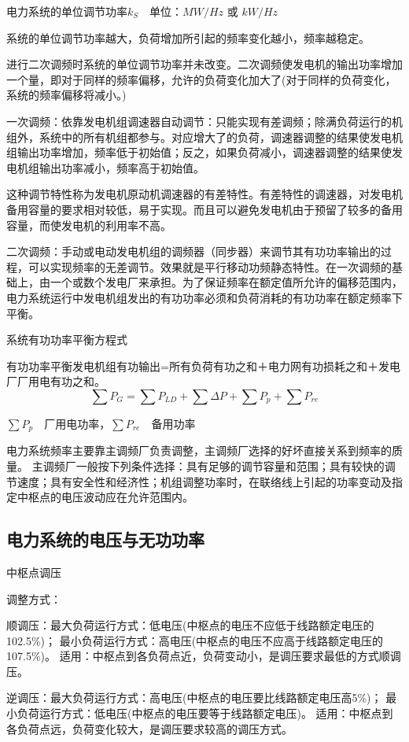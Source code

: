 \documentclass[UTF8, 12pt, a4paper]{ctexart}
\begin{document}
电力系统的单位调节功率$k_S \quad$单位：$MW/Hz$ 或 $kW/Hz$

系统的单位调节功率越大，负荷增加所引起的频率变化越小，频率越稳定。

进行二次调频时系统的单位调节功率并未改变。二次调频使发电机的输出功率增加一个量，即对于同样的频率偏移，允许的负荷变化加大了(对于同样的负荷变化，系统的频率偏移将减小。)

一次调频：依靠发电机组调速器自动调节：只能实现有差调频；除满负荷运行的机组外，系统中的所有机组都参与。对应增大了的负荷，调速器调整的结果使发电机组输出功率增加，频率低于初始值；反之，如果负荷减小，调速器调整的结果使发电机组输出功率减小，频率高于初始值。

这种调节特性称为发电机原动机调速器的有差特性。有差特性的调速器，对发电机备用容量的要求相对较低，易于实现。而且可以避免发电机由于预留了较多的备用容量，而使发电机的利用率不高。

二次调频：手动或电动发电机组的调频器（同步器）来调节其有功功率输出的过程，可以实现频率的无差调节。效果就是平行移动功频静态特性。在一次调频的基础上，由一个或数个发电厂来承担。为了保证频率在额定值所允许的偏移范围内，电力系统运行中发电机组发出的有功功率必须和负荷消耗的有功功率在额定频率下平衡。

系统有功功率平衡方程式

有功功率平衡发电机组有功输出=所有负荷有功之和＋电力网有功损耗之和＋发电厂厂用电有功之和。
\[\sum P _ { G } = \sum P _ { L D } +\sum {\Delta P } +\sum P _ { p } + \sum P _ { re }\]

$\sum P _ { p }\quad$厂用电功率，$\sum P _ { re }\quad$备用功率

电力系统频率主要靠主调频厂负责调整，主调频厂选择的好坏直接关系到频率的质量。
主调频厂一般按下列条件选择：具有足够的调节容量和范围；具有较快的调节速度；具有安全性和经济性；机组调整功率时，在联络线上引起的功率变动及指定中枢点的电压波动应在允许范围内。
\subsection{电力系统的电压与无功功率}
中枢点调压

调整方式：

顺调压：最大负荷运行方式：低电压(中枢点的电压不应低于线路额定电压的102.5\%)；
最小负荷运行方式：高电压(中枢点的电压不应高于线路额定电压的107.5\%)。
适用：中枢点到各负荷点近，负荷变动小，是调压要求最低的方式顺调压。


逆调压：最大负荷运行方式：高电压(中枢点的电压要比线路额定电压高5\%)；
最小负荷运行方式：低电压(中枢点的电压要等于线路额定电压)。
适用：中枢点到各负荷点远，负荷变化较大，是调压要求较高的调压方式。
\end{document}
